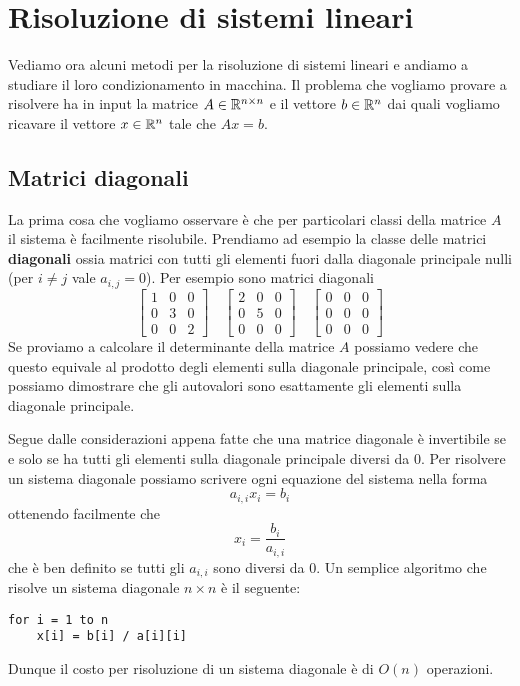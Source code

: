 \section{Risoluzione di sistemi lineari}
Vediamo ora alcuni metodi per la risoluzione di sistemi lineari e andiamo a studiare il loro condizionamento
in macchina. Il problema che vogliamo provare a risolvere ha in input la matrice $A \in \mathbb{R}^{n \times n}$ e il
vettore $b \in \mathbb{R}^n$ dai quali vogliamo ricavare il vettore $x \in \mathbb{R}^n$ tale che $A x = b$.

\subsection{Matrici diagonali}
La prima cosa che vogliamo osservare è che per particolari classi della matrice $A$ il sistema è facilmente
risolubile. Prendiamo ad esempio la classe delle matrici \textbf{diagonali} ossia matrici con tutti gli elementi
fuori dalla diagonale principale nulli (per $i \neq j$ vale $a_{i,j} = 0$). Per esempio sono matrici diagonali
\[
	\begin{bmatrix}
		1 & 0 & 0 \\
		0 & 3 & 0 \\
		0 & 0 & 2
	\end{bmatrix} \quad
	\begin{bmatrix}
		2 & 0 & 0 \\
		0 & 5 & 0 \\
		0 & 0 & 0
	\end{bmatrix} \quad
	\begin{bmatrix}
		0 & 0 & 0 \\
		0 & 0 & 0 \\
		0 & 0 & 0
	\end{bmatrix}
\]
Se proviamo a calcolare il determinante della matrice $A$ possiamo vedere che questo equivale al prodotto degli
elementi sulla diagonale principale, così come possiamo dimostrare che gli autovalori sono esattamente gli
elementi sulla diagonale principale.

Segue dalle considerazioni appena fatte che una matrice diagonale è invertibile se e solo se ha tutti gli elementi
sulla diagonale principale diversi da 0. Per risolvere un sistema diagonale possiamo scrivere ogni equazione del
sistema nella forma
\[ a_{i,i} x_i = b_i \]
ottenendo facilmente che
\[ x_i = \frac{b_i}{a_{i,i}} \]
che è ben definito se tutti gli $a_{i,i}$ sono diversi da 0. Un semplice algoritmo che risolve un sistema diagonale
$n \times n$ è il seguente:
\begin{lstlisting}[language=pseudo, style=pseudo-style]
for i = 1 to n
	x[i] = b[i] / a[i][i]
\end{lstlisting}
Dunque il costo per risoluzione di un sistema diagonale è di $O(n)$ operazioni.

